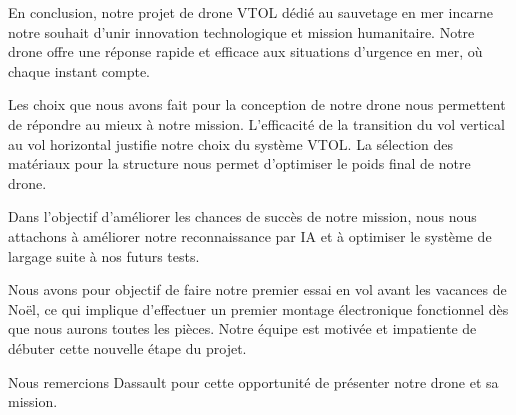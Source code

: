 \documentclass[a4paper,12pt,french]{report}
\begin{document}
En conclusion, notre projet de drone VTOL dédié au sauvetage en mer incarne notre souhait d'unir innovation technologique et mission humanitaire. Notre drone offre une réponse rapide et efficace aux situations d'urgence en mer, où chaque instant compte.

Les choix que nous avons fait pour la conception de notre drone nous permettent de répondre au mieux à notre mission. L'efficacité de la transition du vol vertical au vol horizontal justifie notre choix du système VTOL. La sélection des matériaux pour la structure nous permet d'optimiser le poids final de notre drone.

Dans l'objectif d'améliorer les chances de succès de notre mission, nous nous attachons à améliorer notre reconnaissance par IA et à optimiser le système de largage suite à nos futurs tests.

Nous avons pour objectif de faire notre premier essai en vol avant les vacances de Noël, ce qui implique d'effectuer un premier montage électronique fonctionnel dès que nous aurons toutes les pièces. Notre équipe est motivée et impatiente de débuter cette nouvelle étape du projet.

Nous remercions Dassault pour cette opportunité de présenter notre drone et sa mission.
\end{document}
